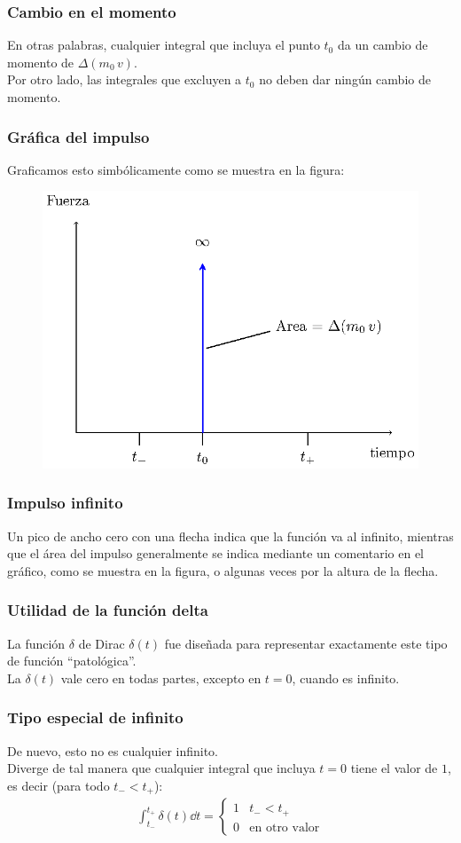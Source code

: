\documentclass[12pt]{beamer}
\begin{document}
\begin{frame}
\frametitle{Cambio en el momento}
En otras palabras, cualquier integral que incluya el punto $t_{0}$ da un cambio de momento de $\Delta (m_{0} \, v)$.
\\
\bigskip
\pause
Por otro lado, las integrales que excluyen a $t_{0}$ no deben dar ningún cambio de momento.
\end{frame}
\begin{frame}
\frametitle{Gráfica del impulso}
Graficamos esto simbólicamente como se muestra en la figura:
\begin{figure}
    \centering
    \includegraphics[scale=0.75]{Imagenes/delta_Dirac_Momento_03.eps}
\end{figure}
\end{frame}
\begin{frame}
\frametitle{Impulso infinito}
Un pico de ancho cero con una flecha indica que la función va al infinito, mientras que el área del impulso generalmente se indica mediante un comentario en el gráfico, como se muestra en la figura, o algunas veces por la altura de la flecha.
\end{frame}
\begin{frame}
\frametitle{Utilidad de la función delta}
La función $\delta$ de Dirac $\delta (t)$ fue diseñada para representar exactamente este tipo de función \enquote{patológica}.
\\
\bigskip
\pause
La $\delta (t)$ vale cero en todas partes, excepto en $t = 0$, cuando es infinito.
\end{frame}
\begin{frame}
\frametitle{Tipo especial de infinito}
De nuevo, esto no es cualquier infinito.
\\
\bigskip
\pause
Diverge de tal manera que cualquier integral que incluya $t = 0$ tiene el valor de $1$, es decir (para todo $t_{-} < t_{+}$):
\pause
\begin{align}
\int_{t_{-}}^{t_{+}} \delta (t) \dd{t} = \begin{cases}
1 & t_{-} < t_{+} \\
0 & \mbox{en otro valor}
\end{cases}
\label{eq:ecuacion_05_03}
\end{align}
\end{frame}
\end{document}
